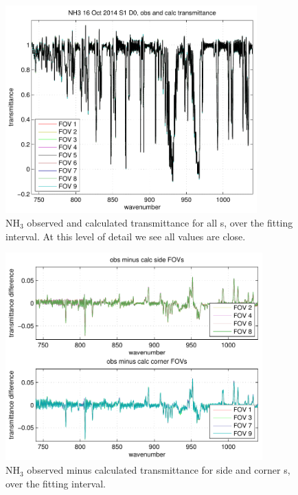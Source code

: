 \documentclass[12pt]{article}
\begin{document}
\begin{figure}
  \centering
  \includegraphics[height=8cm]{figures/NH3_obs_and_calc.pdf}
  \caption{NH$_3$ observed and calculated transmittance for all
    {\fov}s, over the fitting interval.  At this level of detail we
    see all values are close.}
\end{figure}


\begin{figure}
  \centering
  \includegraphics[height=8cm]{figures/NH3_breakout_2.pdf}
  \caption{NH$_3$ observed minus calculated transmittance for side
    and corner {\fov}s, over the fitting interval.}
\end{figure}

\end{document}
